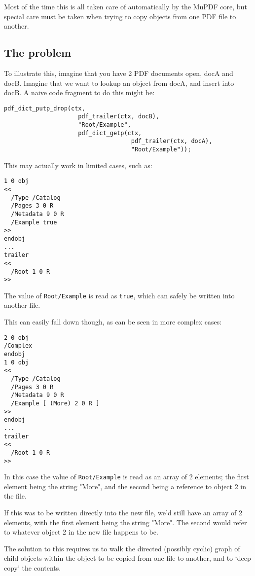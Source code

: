 \documentclass[oneside]{book}
\begin{document}
Most of the time this is all taken care of automatically by the MuPDF core, but special care must be taken when trying to copy objects from one PDF file to another.

\subsection{The problem}

To illustrate this, imagine that you have 2 PDF documents open, docA and docB. Imagine that we want to lookup an object from docA, and insert into docB. A naive code fragment to do this might be:

\begin{lstlisting}
pdf_dict_putp_drop(ctx,
                     pdf_trailer(ctx, docB),
                     "Root/Example",
                     pdf_dict_getp(ctx,
                                    pdf_trailer(ctx, docA),
                                    "Root/Example")); 
\end{lstlisting}

This may actually work in limited cases, such as:

\begin{lstlisting}
1 0 obj
<<
  /Type /Catalog
  /Pages 3 0 R
  /Metadata 9 0 R
  /Example true
>>
endobj
...
trailer
<<
  /Root 1 0 R
>>
\end{lstlisting}

The value of \texttt{Root/Example} is read as \texttt{true}, which can safely be written into another file.

This can easily fall down though, as can be seen in more complex cases:

\begin{lstlisting}
2 0 obj
/Complex
endobj
1 0 obj
<<
  /Type /Catalog
  /Pages 3 0 R
  /Metadata 9 0 R
  /Example [ (More) 2 0 R ]
>>
endobj
...
trailer
<<
  /Root 1 0 R
>>
\end{lstlisting}

In this case the value of \texttt{Root/Example} is read as an array of 2 elements; the first element being the string "More", and the second being a reference to object 2 in the file.

If this was to be written directly into the new file, we'd still have an array of 2 elements, with the first element being the string "More". The second would refer to whatever object 2 in the new file happens to be. 

The solution to this requires us to walk the directed (possibly cyclic) graph of child objects within the object to be copied from one file to another, and to `deep copy' the contents.
\end{document}
